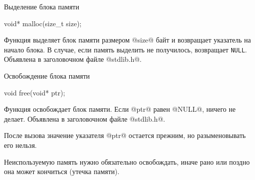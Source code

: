 \begin{frame}[fragile]{Выделение блока памяти}

  \begin{clisting}[basicstyle=\ttfamily]
    void* malloc(size_t size);
  \end{clisting}
  \revertListingParskip
  Функция выделяет блок памяти размером @size@ байт и возвращает указатель на
  начало блока. \alert<2>{В случае, если память выделить не получилось,
  возвращает \texttt{NULL}.}
  Объявлена в заголовочном файле @stdlib.h@.


\end{frame}

\begin{frame}[fragile]{Освобождение блока памяти}

  \begin{clisting}[basicstyle=\ttfamily]
    void free(void* ptr);
  \end{clisting}

  Функция освобождает блок памяти. Если @ptr@ равен @NULL@, ничего не делает.
  Объявлена в заголовочном файле @stdlib.h@.

  \pause
  После вызова значение указателя @ptr@ остается прежним, но разыменовывать его
  нельзя.

  \pause
  Неиспользуемую память нужно обязательно освобождать, иначе рано или поздно
  она может кончиться (утечка памяти).



\end{frame}

